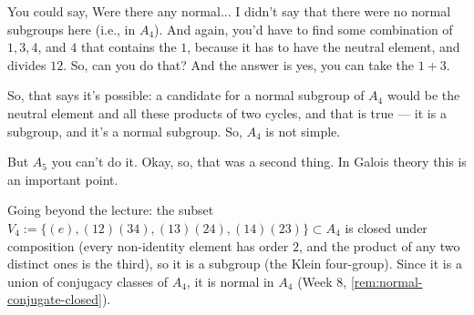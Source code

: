 \begin{speech}[00:25:52 - 00:26:34]
You could say,  Were there any normal... I didn't say that there were no normal subgroups here (i.e., in $A_4$). And again, you'd have to find some combination of $1, 3, 4$, and $4$ that contains the $1$, because it has to have the neutral element, and divides $12$. So, can you do that? And the answer is yes, you can take the $1 + 3$.

So, that says it's possible: a candidate for a normal subgroup of $A_4$ would be the neutral element and all these products of two cycles, and that is true --- it is a subgroup, and it's a normal subgroup. So, $A_4$ is not simple.

But $A_5$ you can't do it. Okay, so, that was a second thing. In Galois theory this is an important point.
\end{speech}

\begin{content}

\begin{steps}
Going beyond the lecture: the subset $V_4 := \{ (e), (12)(34), (13)(24), (14)(23) \} \subset A_4$ is closed under composition (every non-identity element has order $2$, and the product of any two distinct ones is the third), so it is a subgroup (the Klein four-group). Since it is a union of conjugacy classes of $A_4$, it is normal in $A_4$ (Week 8, \cref{rem:normal-conjugate-closed}).
\end{steps}
\end{content}

\begin{hidden}
\end{hidden}

